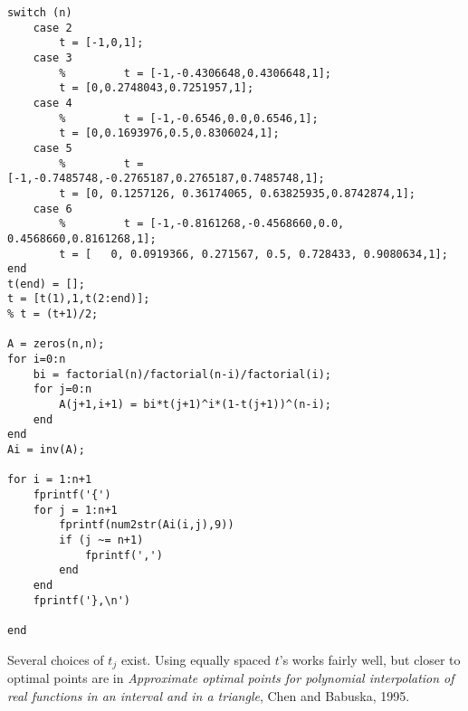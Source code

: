 \documentclass{article}
\begin{document}
\begin{verbatim}
switch (n)
    case 2
        t = [-1,0,1];
    case 3
        %         t = [-1,-0.4306648,0.4306648,1];
        t = [0,0.2748043,0.7251957,1];
    case 4
        %         t = [-1,-0.6546,0.0,0.6546,1];
        t = [0,0.1693976,0.5,0.8306024,1];
    case 5
        %         t = [-1,-0.7485748,-0.2765187,0.2765187,0.7485748,1];
        t = [0, 0.1257126, 0.36174065, 0.63825935,0.8742874,1];
    case 6
        %         t = [-1,-0.8161268,-0.4568660,0.0, 0.4568660,0.8161268,1];
        t = [   0, 0.0919366, 0.271567, 0.5, 0.728433, 0.9080634,1];
end
t(end) = [];
t = [t(1),1,t(2:end)];
% t = (t+1)/2;

A = zeros(n,n);
for i=0:n
    bi = factorial(n)/factorial(n-i)/factorial(i);
    for j=0:n
        A(j+1,i+1) = bi*t(j+1)^i*(1-t(j+1))^(n-i);
    end
end
Ai = inv(A);

for i = 1:n+1
    fprintf('{')
    for j = 1:n+1
        fprintf(num2str(Ai(i,j),9))
        if (j ~= n+1)
            fprintf(',')
        end
    end
    fprintf('},\n')
    
end
\end{verbatim}
Several choices of $t_j$ exist. Using equally spaced $t$'s works fairly well, but closer to optimal points are in \textit{Approximate optimal points for polynomial interpolation of real functions in an interval and in a triangle}, Chen and Babuska, 1995.
\end{document}
